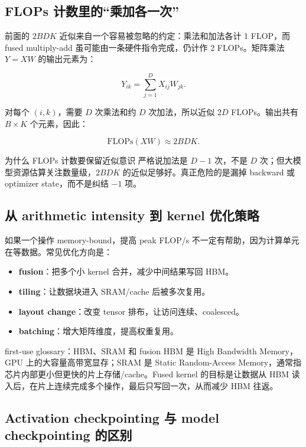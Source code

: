 \documentclass[a4paper]{article}
\begin{document}
\subsection{FLOPs 计数里的“乘加各一次”}

前面的 $2BDK$ 近似来自一个容易被忽略的约定：乘法和加法各计 1 FLOP，而 fused multiply-add 虽可能由一条硬件指令完成，仍计作 2 FLOPs。矩阵乘法 \(Y=XW\) 的输出元素为：

\[
Y_{ik}=\sum_{j=1}^{D}X_{ij}W_{jk}.
\]

对每个 \((i,k)\)，需要 \(D\) 次乘法和约 \(D\) 次加法，所以近似 \(2D\) FLOPs。输出共有 \(B\times K\) 个元素，因此：

\[
\mathrm{FLOPs}(XW)\approx 2BDK.
\]

\begin{importantbox}{为什么 FLOPs 计数要保留近似意识}
严格说加法是 \(D-1\) 次，不是 \(D\) 次；但大模型资源估算关注数量级，\(2BDK\) 的近似足够好。真正危险的是漏掉 backward 或 optimizer state，而不是纠结 \(-1\) 项。
\end{importantbox}

\subsection{从 arithmetic intensity 到 kernel 优化策略}

如果一个操作 memory-bound，提高 peak FLOP/s 不一定有帮助，因为计算单元在等数据。常见优化方向是：

\begin{itemize}
    \item \textbf{fusion}：把多个小 kernel 合并，减少中间结果写回 HBM。
    \item \textbf{tiling}：让数据块进入 SRAM/cache 后被多次复用。
    \item \textbf{layout change}：改变 tensor 排布，让访问连续、coalesced。
    \item \textbf{batching}：增大矩阵维度，提高权重复用。
\end{itemize}

\begin{knowledgebox}{first-use glossary：HBM、SRAM 和 fusion}
HBM 是 High Bandwidth Memory，GPU 上的大容量高带宽显存；SRAM 是 Static Random-Access Memory，通常指芯片内部更小但更快的片上存储/cache。Fused kernel 的目标是让数据从 HBM 读入后，在片上连续完成多个操作，最后只写回一次，从而减少 HBM 往返。
\end{knowledgebox}

\subsection{Activation checkpointing 与 model checkpointing 的区别}
\end{document}
